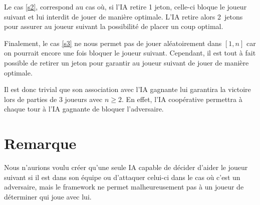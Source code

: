 \documentclass[10pt,a4paper]{article}
\begin{document}
Le cas \eqref{s2}, correspond au cas où, si l'IA retire 1 jeton, celle-ci bloque
le joueur suivant et lui interdit de jouer de manière optimale.
L'IA retire alors 2~jetons pour assurer au joueur suivant la possibilité de
placer un coup optimal.

Finalement, le cas \eqref{s3} ne nous
permet pas de jouer aléatoirement dans $[1, n]$ car on pourrait encore une fois
bloquer le joueur suivant. Cependant, il est tout à fait possible de retirer un
jeton pour garantir au joueur suivant de jouer de manière optimale.

Il est donc trivial que son association avec l'IA gagnante lui garantira
la victoire lors de parties de 3 joueurs avec $n \geq 2$.  En effet,
l'IA coopérative permettra à chaque tour à l'IA gagnante de bloquer
l'adversaire.

\section{Remarque}
Nous n'aurions voulu créer qu'une seule IA capable de décider d'aider le joueur
suivant si il est dans son équipe ou d'attaquer celui-ci dans le cas où c'est
un adversaire, mais le framework ne permet malheureusement
pas à un joueur de déterminer qui joue avec lui.
\end{document}

